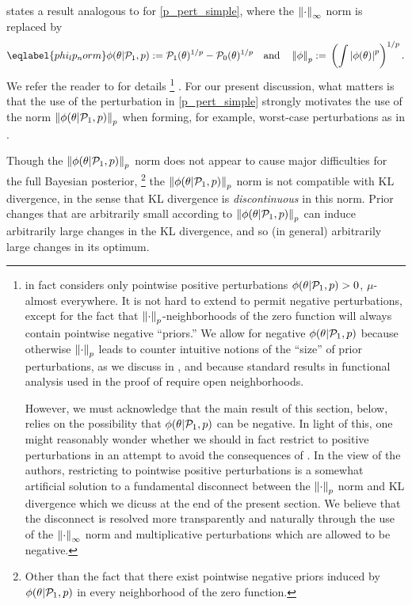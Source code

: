 \citet[Result 2]{gustafson:1996:local} states
a result analogous to  for \eqref{p_pert_simple}, where
the $\left\Vert\cdot\right\Vert_{\infty}$ norm is replaced by
%
\begin{align}\eqlabel{phi_lp_norm}
%
\phi(\theta \vert \palt, p) :={}
    \palt(\theta)^{1/p} - \pbase(\theta)^{1/p} \mathand
\norm{\phi}_p :={} \left(\int \abs{\phi(\theta)}^p \right)^{1/p}.
%
\end{align}
%
We refer the reader to \citet{gustafson:1996:local} for details
%
\footnote{\citet{gustafson:1996:local} in fact considers only pointwise positive
perturbations $\phi(\theta \vert \mathcal{P}_{1}, p) > 0$, $\mu$-almost everywhere.  It is
not hard to extend  \citet[Result
2]{gustafson:1996:local} to permit negative perturbations, except for the fact
that $\left\Vert\cdot\right\Vert_p$-neighborhoods of the zero function will always contain
pointwise negative ``priors.''
%
We allow for negative $\phi(\theta \vert \mathcal{P}_{1}, p)$ because otherwise
$\left\Vert\cdot\right\Vert_p$ leads to counter intuitive notions of the ``size'' of prior
perturbations, as we discuss in , and because standard
results in functional analysis used in the proof of 
require open neighborhoods.

However, we must acknowledge that the main result of this section,
 below, relies on the possibility that $\phi(\theta
\vert \mathcal{P}_{1}, p)$ can be negative.   In light of this, one might reasonably
wonder whether we should in fact restrict to positive perturbations in an
attempt to avoid the consequences of . In the view of
the authors, restricting to pointwise positive perturbations is a somewhat
artificial solution to a fundamental disconnect between the $\left\Vert\cdot\right\Vert_p$
norm and KL divergence which we dicuss at the end of the present section. We
believe that the disconnect is resolved more transparently and naturally through
the use of the $\left\Vert\cdot\right\Vert_{\infty}$ norm and multiplicative perturbations which are
allowed to be negative.}
%
.  For our present discussion, what matters is that the use of the perturbation
in \eqref{p_pert_simple} strongly motivates the use of the norm
$\left\Vert\phi(\theta \vert \mathcal{P}_{1}, p)\right\Vert_p$ when forming, for example, worst-case
perturbations as in .

Though the $\left\Vert\phi(\theta \vert \mathcal{P}_{1}, p)\right\Vert_p$ norm does not appear to cause
major difficulties for the full Bayesian posterior,
%
\footnote{Other than the fact that there exist pointwise negative priors
induced by $\phi(\theta \vert \mathcal{P}_{1}, p)$ in every neighborhood of the
zero function.}
%
the $\left\Vert\phi(\theta \vert \mathcal{P}_{1}, p)\right\Vert_p$ norm is not compatible with KL
divergence, in the sense that KL divergence is {\em discontinuous} in this norm.
Prior changes that are arbitrarily small according to $\left\Vert\phi(\theta \vert
\mathcal{P}_{1}, p)\right\Vert_p$ can induce arbitrarily large changes in the KL divergence, and so
(in general) arbitrarily large changes in its optimum.

